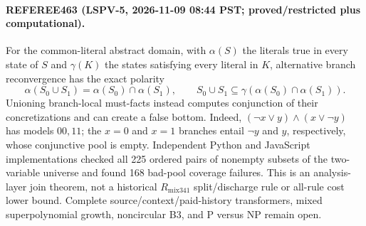 \paragraph{REFEREE463 (LSPV-5, 2026-11-09 08:44 PST; proved/restricted plus computational).}
For the common-literal abstract domain, with
$\alpha(S)$ the literals true in every state of $S$ and
$\gamma(K)$ the states satisfying every literal in $K$, alternative branch
reconvergence has the exact polarity
\[
\alpha(S_0\cup S_1)=\alpha(S_0)\cap\alpha(S_1),\qquad
S_0\cup S_1\subseteq\gamma(\alpha(S_0)\cap\alpha(S_1)).
\]
Unioning branch-local must-facts instead computes conjunction of their
concretizations and can create a false bottom.  Indeed,
$(\neg x\lor y)\land(x\lor\neg y)$ has models $00,11$; the $x=0$ and $x=1$
branches entail $\neg y$ and $y$, respectively, whose conjunctive pool is
empty.  Independent Python and JavaScript implementations checked all 225
ordered pairs of nonempty subsets of the two-variable universe and found 168
bad-pool coverage failures.  This is an analysis-layer join theorem, not a
historical $R_{\mathrm{mix341}}$ split/discharge rule or all-rule cost lower
bound.  Complete source/context/paid-history transformers, mixed
superpolynomial growth, noncircular B3, and P versus NP remain open.
